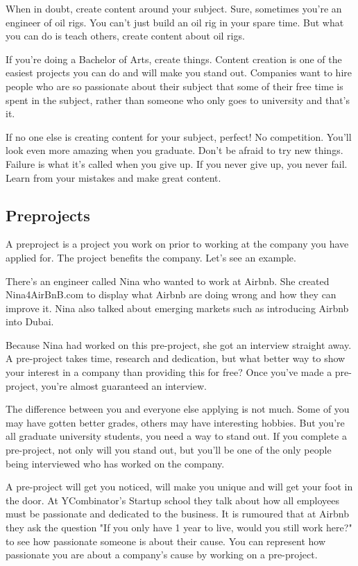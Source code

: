 \documentclass{article}
\begin{document}
When in doubt, create content around your subject. Sure, sometimes
you're an engineer of oil rigs. You can't just build an oil rig in your
spare time. But what you can do is teach others, create content about
oil rigs.

If you're doing a Bachelor of Arts, create things. Content creation is
one of the easiest projects you can do and will make you stand out.
Companies want to hire people who are so passionate about their subject
that some of their free time is spent in the subject, rather than
someone who only goes to university and that's it.

If no one else is creating content for your subject, perfect! No
competition. You'll look even more amazing when you graduate. Don't be
afraid to try new things. Failure is what it's called when you give up.
If you never give up, you never fail. Learn from your mistakes and make
great content.
\subsection{Preprojects}
A preproject is a project you work on prior to working at the company
you have applied for. The project benefits the company. Let's see an
example.

There's an engineer called Nina who wanted to work at Airbnb. She
created Nina4AirBnB.com to display what Airbnb are doing wrong and how
they can improve it. Nina also talked about emerging markets such as
introducing Airbnb into Dubai.

Because Nina had worked on this pre-project, she got an interview
straight away. A pre-project takes time, research and dedication, but
what better way to show your interest in a company than providing this
for free? Once you've made a pre-project, you're almost guaranteed an
interview.

The difference between you and everyone else applying is not much. Some
of you may have gotten better grades, others may have interesting
hobbies. But you're all graduate university students, you need a way to
stand out. If you complete a pre-project, not only will you stand out,
but you'll be one of the only people being interviewed who has worked on
the company.

A pre-project will get you noticed, will make you unique and will get
your foot in the door. At YCombinator's Startup school they talk about
how all employees must be passionate and dedicated to the business. It
is rumoured that at Airbnb they ask the question "If you only have 1
year to live, would you still work here?" to see how passionate someone
is about their cause. You can represent how passionate you are about a
company's cause by working on a pre-project.
\end{document}

